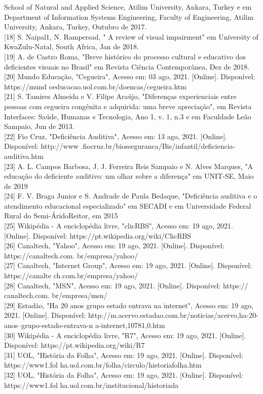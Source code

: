 \documentclass[a4paper]{article}
\begin{document}
\begin{titlepage}
School of Natural and Applied Science, Atilim University, Ankara, Turkey e em Department of Information Systems Engineering, Faculty of Engineering, Atilim University, Ankara, Turkey, Outubro de 2017.\\[0.5cm] [18] S. Naipal1, N. Rampersad, " A review of visual impairment" em University of KwaZulu-Natal, South Africa, Jan de 2018.\\[0.5cm] [19] A. de Castro Roma, "Breve histórico do processo cultural e educativo dos deficientes visuais no Brasil" em Revista Ciência Contemporânea, Dez de 2018.\\[0.5cm] [20] Mundo Educação, "Cegueira", Acesso em: 03 ago, 2021. [Online]. Disponível: https://mund oeducacao.uol.com.br/doencas/cegueira.htm\\[0.5cm] [21] S. Tamires Almeida e V. Filipe Araújo, "Diferenças experienciais entre pessoas com cegueira congênita e adquirida: uma breve apreciação", em Revista Interfaces: Saúde, Humanas e Tecnologia, Ano 1, v. 1, n.3 e em Faculdade Leão Sampaio, Jun de 2013.\\[0.5cm] [22] Fio Cruz, "Deficiência Auditiva", Acesso em: 13 ago, 2021. [Online]. Disponível: http://www .fiocruz.br/biosseguranca/Bis/infantil/deficiencia-auditiva.htm\\[0.5cm] [23] A. L. Campos Barbosa, J. J. Ferreira Reis Sampaio e N. Alves Marques, "A educação do deficiente auditivo: um olhar sobre a diferença" em UNIT-SE, Maio de 2019\\[0.5cm] [24] F. V. Braga Junior e S. Andrade de Paula Bedaque, "Deficiência auditiva e o atendimento educacional especializado" em SECADI e em Universidade Federal Rural do Semi-ÁridoReitor, em 2015\\[0.5cm] [25] Wikipédia - A enciclopédia livre, "clicRBS", Acesso em: 19 ago, 2021. [Online]. Disponível: https://pt.wikipedia.org/wiki/ClicRBS\\[0.5cm] [26] Canaltech, "Yahoo", Acesso em: 19 ago, 2021. [Online]. Disponível: https://canaltech.com. br/empresa/yahoo/\\[0.5cm] [27] Canaltech, "Internet Group", Acesso em: 19 ago, 2021. [Online]. Disponível: https://canalte ch.com.br/empresa/yahoo/\\[0.5cm] [28] Canaltech, "MSN", Acesso em: 19 ago, 2021. [Online]. Disponível: https:// canaltech.com. br/empresa/msn/\\[0.5cm] [29] Estadão, "Ha 20 anos grupo estado entrava na internet", Acesso em: 19 ago, 2021. [Online]. Disponível: http://m.acervo.estadao.com.br/noticias/acervo,ha-20-anos--grupo-estado-entrava-n a-internet,10781,0.htm\\[0.5cm] [30] Wikipédia - A enciclopédia livre, "R7", Acesso em: 19 ago, 2021. [Online]. Disponível: https://pt.wikipedia.org/wiki/R7\\[0.5cm] [31] UOL, "História da Folha", Acesso em: 19 ago, 2021. [Online]. Disponível: https://www1.fol ha.uol.com.br/folha/circulo/historia\textunderscore folha.htm\\[0.5cm] [32] UOL, "História da Folha", Acesso em: 19 ago, 2021. [Online]. Disponível: https://www1.fol ha.uol.com.br/institucional/historia\textunderscore da\textunderscore 
\end{titlepage}
\end{document}
